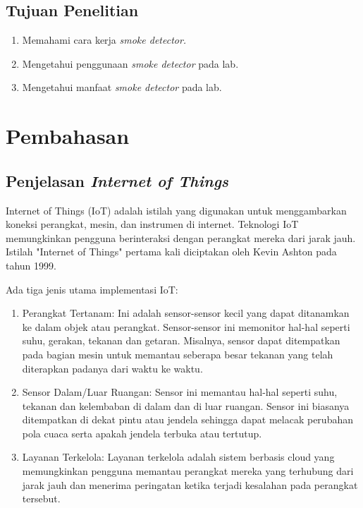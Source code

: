 \documentclass{article}
\begin{document}
    \subsection{Tujuan Penelitian}
    \begin{enumerate}
        \item Memahami cara kerja \textit{smoke detector.}
        \item Mengetahui penggunaan \textit{smoke detector} pada lab.
        \item Mengetahui manfaat \textit{smoke detector} pada lab.
    \end{enumerate}
    
    \pagebreak

    \section{Pembahasan}
    \subsection{Penjelasan \textit{Internet of Things}}
    Internet of Things (IoT) adalah istilah yang digunakan
    untuk menggambarkan koneksi perangkat, mesin, dan
    instrumen di internet. Teknologi IoT memungkinkan
    pengguna berinteraksi dengan perangkat mereka dari
    jarak jauh. Istilah "Internet of Things" pertama kali
    diciptakan oleh Kevin Ashton pada tahun 1999.

    Ada tiga jenis utama implementasi IoT:
    \begin{enumerate}
        \item Perangkat Tertanam: Ini adalah sensor-sensor
            kecil yang dapat ditanamkan ke dalam objek atau
            perangkat. Sensor-sensor ini memonitor hal-hal
            seperti suhu, gerakan, tekanan dan getaran.
            Misalnya, sensor dapat ditempatkan pada bagian
            mesin untuk memantau seberapa besar tekanan
            yang telah diterapkan padanya dari waktu ke
            waktu.
        \item Sensor Dalam/Luar Ruangan: Sensor ini
            memantau hal-hal seperti suhu, tekanan dan
            kelembaban di dalam dan di luar ruangan. Sensor
            ini biasanya ditempatkan di dekat pintu atau
            jendela sehingga dapat melacak perubahan pola
            cuaca serta apakah jendela terbuka atau
            tertutup.
        \item Layanan Terkelola: Layanan terkelola adalah
            sistem berbasis cloud yang memungkinkan
            pengguna memantau perangkat mereka yang
            terhubung dari jarak jauh dan menerima
            peringatan ketika terjadi kesalahan pada
            perangkat tersebut.
    \end{enumerate} 
\end{document}
